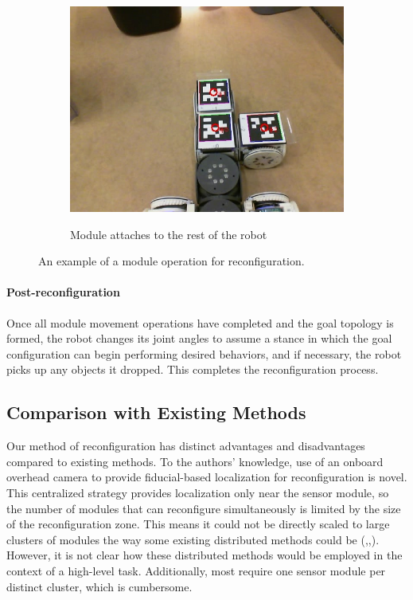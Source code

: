 \documentclass[conference]{IEEEtran}
\begin{document}
\begin{figure}[t]
\begin{subfigure}[t]{0.32\columnwidth}
        \includegraphics[width=\textwidth]{images/reconf_attach.jpg}
        \label{fig:reconfc}
        \caption{Module attaches to the rest of the robot}
    \end{subfigure}
    \caption{An example of a module operation for reconfiguration.}
      \label{fig:reconf}
\end{figure}

\paragraph{Post-reconfiguration} Once all module movement operations have completed and the goal topology is formed, the robot changes its joint angles to assume a stance in which the goal configuration can begin performing desired behaviors, and if necessary, the robot picks up any objects it dropped. This completes the reconfiguration process. 

\subsection{Comparison with Existing Methods}
Our method of reconfiguration has distinct advantages and disadvantages compared to existing methods.  To the authors' knowledge, use of an onboard overhead camera to provide fiducial-based localization for reconfiguration is novel.  This centralized strategy provides localization only near the sensor module, so the number of modules that can reconfigure simultaneously is limited by the size of the reconfiguration zone.  This means it could not be directly scaled to large clusters of modules the way some existing distributed methods could be (\cite{Yim2007},\cite{Murata2006},\cite{Rubenstein2004}).  However, it is not clear how these distributed methods would be employed in the context of a high-level task.  Additionally, most require one sensor module per distinct cluster, which is cumbersome.
\end{document}
